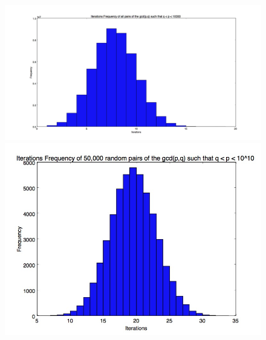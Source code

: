 \documentclass[11pt]{article}
\begin{document}
	\begin{figure}
		\centering
		\includegraphics[scale=.3]{4digit_iteration_freq.jpg}
		\includegraphics[scale=.45]{10_digit_numbers.jpg}
		
	\end{figure}
	
\end{document}
